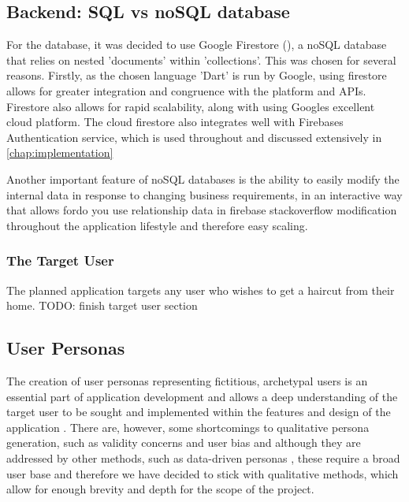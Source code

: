 \documentclass[12pt]{article}
\begin{document}
	\subsection{Backend: SQL vs noSQL database}
	For the database, it was decided to use Google Firestore (\cite{CloudFirestoreFirebase}), a noSQL database that relies on  nested 'documents' within 'collections'. This was chosen for several reasons. Firstly, as the chosen language 'Dart' is run by Google, using firestore allows for greater integration and congruence with the platform and APIs. Firestore also allows for rapid scalability, along with using Googles excellent cloud platform. The cloud firestore also integrates well with Firebases Authentication service, which is used throughout and discussed extensively in \autoref{chap:implementation}
	
	Another important feature of noSQL databases is the ability to easily modify the internal data in response to changing business requirements, in an interactive way that allows fordo you use relationship data in firebase stackoverflow modification throughout the application lifestyle and therefore easy scaling.
	
	

	
	
	\subsubsection{The Target User}
	The planned application targets any user who wishes to get a haircut from their home.
	TODO: finish target user section 

	
	
	\subsection{User Personas}
	\label{user-personas}
	The creation of user personas representing fictitious, archetypal users is an essential part of application development \cite{PDFPersonasParticipatory} and allows a deep understanding of the target user to be sought and implemented within the features and design of the application \cite{arnowitzChapter15Wireframe2007}. There are, however, some shortcomings to qualitative persona generation, such as validity concerns and user bias \cite{chapmanPersonasNewClothes2005} and although they are addressed by other methods, such as data-driven personas \cite{mcginnDatadrivenPersonaDevelopment2008}, these require a broad user base and therefore we have decided to stick with qualitative methods, which allow for enough brevity and depth for the scope of the project.
	
\end{document}
